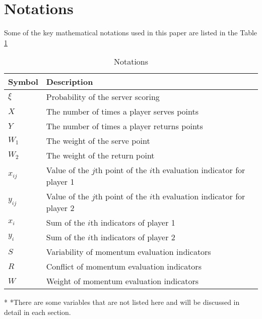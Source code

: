 \documentclass[12pt]{article}  %
\begin{document}
\section{Notations}
Some of the key mathematical notations used in this paper are listed in the Table \ref{tab}
\begin{table}[htbp]
	\begin{center}
		\caption{Notations}
		\begin{tabular}{m{1.5cm} m{12.1cm}}%
			\toprule[2pt]
			\multicolumn{1}{m{2.7cm}}{\centering Symbol}%
			&\multicolumn{1}{m{12cm}}{\centering Description }\\%
			\midrule
			$\xi$& Probability of the server scoring \\\vspace{2pt}
			$X$& The number of times a player serves points\\\vspace{2pt}
			$Y$& The number of times a player returns points \\\vspace{2pt}
			$W_1$& The weight of the serve point \\\vspace{2pt}
			$W_2$& The weight of the return point \\\vspace{2pt}
			$x_{ij}$& Value of the $j$th point of the $i$th evaluation indicator for player 1\\\vspace{2pt}
			$y_{ij}$& Value of the $j$th point of the $i$th evaluation indicator for player 2\\\vspace{2pt}
			$x_i$& Sum of the $i$th indicators of player 1\\\vspace{2pt}
			$y_i$& Sum of the $i$th indicators of player 2\\\vspace{2pt}
			$S$& Variability of momentum evaluation indicators\\\vspace{2pt}
			$R$& Conflict of momentum evaluation indicators\\\vspace{2pt}
			$W$& Weight of momentum evaluation indicators
			\\%
		
			\bottomrule[2pt]
		\end{tabular}
		\label{tab}
		
		\begin{tablenotes}%
			\footnotesize
			\item[*] *There are some variables that are not listed here and will be discussed in detail in each section. %
		\end{tablenotes}
	\end{center}
\end{table}
\end{document}
